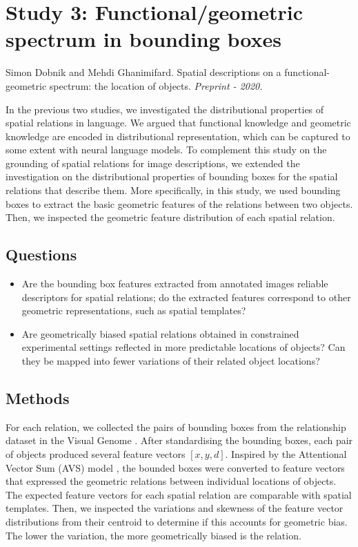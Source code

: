 \section{Study 3: Functional/geometric spectrum in bounding boxes}
\label{study:bbox_grounding}
Simon Dobnik and Mehdi Ghanimifard. 
Spatial descriptions on a functional-geometric spectrum: the location of objects.
\textit{Preprint - 2020.}

In the previous two studies, we investigated the distributional properties of spatial relations in language. 
We argued that functional knowledge and geometric knowledge are encoded in distributional representation, which can be captured to some extent with neural language models. 
To complement this study on the grounding of spatial relations for image descriptions, we extended the investigation on the distributional properties of bounding boxes for the spatial relations that describe them. 
More specifically, in this study, we used bounding boxes to extract the basic geometric features of the relations between two objects. 
Then, we inspected the geometric feature distribution of each %
spatial relation.

\subsection{Questions}
\begin{itemize}
	\item Are the bounding box features extracted from annotated images reliable descriptors for spatial relations; do the extracted features correspond to other geometric representations, such as spatial templates? 
	\item Are geometrically biased spatial relations%
	obtained in constrained experimental settings
	reflected in more predictable locations of objects?
	Can they be mapped into fewer variations of their related object locations?
\end{itemize}

\subsection{Methods}
For each relation, we collected the pairs of bounding boxes from the relationship dataset in the Visual Genome \citep{krishna2017visual}. 
After standardising the bounding boxes, each pair of objects produced several feature vectors $[x, y, d]$.  Inspired by the Attentional Vector Sum (AVS) model  \cite{RegierCarlson:2001},
the bounded boxes were converted to feature vectors that expressed the geometric relations between individual locations of objects.
The expected feature vectors for each spatial relation 
are
comparable with %
spatial templates. 
Then, we inspected the variations and skewness of the feature vector distributions from their centroid to determine if this%
accounts for geometric bias.  
The lower the variation, the more geometrically biased is the relation.

